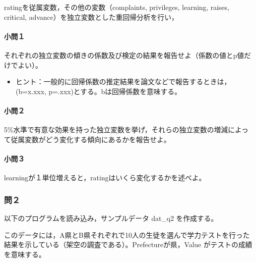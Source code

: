 \documentclass[]{article}
\providecommand{\tightlist}{%
  \setlength{\itemsep}{0pt}\setlength{\parskip}{0pt}}
\let\oldparagraph\paragraph
\renewcommand{\paragraph}[1]{\oldparagraph{#1}\mbox{}}
\begin{document}
ratingを従属変数，その他の変数（complaints, privileges, learning,
raises, critical, advance）を独立変数とした重回帰分析を行い，

\paragraph{小問１}\label{-1}

それぞれの独立変数の傾きの係数及び検定の結果を報告せよ（係数の値とp値だけでよい）。

\begin{itemize}
\tightlist
\item
  ヒント：一般的に回帰係数の推定結果を論文などで報告するときは，(b=x.xxx,
  p=.xxx)とする。bは回帰係数を意味する。
\end{itemize}

\paragraph{小問２}\label{-2}

5\%水準で有意な効果を持った独立変数を挙げ，それらの独立変数の増減によって従属変数がどう変化する傾向にあるかを報告せよ。

\paragraph{小問３}\label{-3}

learningが１単位増えると，ratingはいくら変化するかを述べよ。

\subsubsection{問２}\label{-18}

以下のプログラムを読み込み，サンプルデータ dat\_q2 を作成する。

このデータには，A県とB県それぞれで10人の生徒を選んで学力テストを行った結果を示している（架空の調査である）。Prefectureが県，Value
がテストの成績を意味する。
\end{document}
